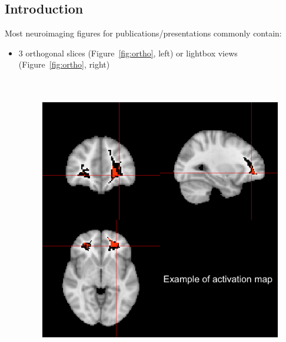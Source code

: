 \documentclass[final]{beamer}\usepackage{graphicx, color}
\title
{ %
Interactive 3 and 4D Images of High Resolution Neuroimage Data 
}
\author{ %
John Muschelli, Elizabeth Sweeney, Ciprian Crainiceanu
}
\institute
[Johns Hopkins Bloomberg School of Public Health] %
{
Johns Hopkins Bloomberg School of Public Health
}
\date{\today}
\begin{document}
\begin{frame}[fragile]
\begin{multicols}{2}

\section{Introduction}

Most neuroimaging figures for publications/presentations commonly contain:
\begin{itemize}
\item 3 orthogonal slices (Figure~\ref{fig:ortho}, left) or lightbox views (Figure~\ref{fig:ortho}, right)
\begin{figure}
  \begin{minipage}[b]{3.5in}
    \includegraphics[width=7in, height=5in]{./figure/ortho.png}
  \end{minipage}\hfill
  \begin{minipage}[b]{3.5in}

\end{minipage}
\end{figure}
\end{itemize}
\end{multicols}
\end{frame}
\end{document}
